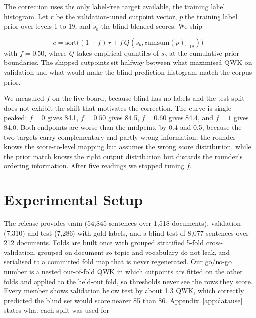 \documentclass[11pt]{article}
\begin{document}
The correction uses the only label-free target available, the training label histogram. Let
$r$ be the validation-tuned cutpoint vector, $p$ the training label prior over levels 1 to
19, and $s_b$ the blind blended scores. We ship

\begin{equation}
c = \mathrm{sort}\big((1-f)\,r + f\,Q(s_b, \mathrm{cumsum}(p)_{1:18})\big)
\end{equation}
with $f = 0.50$, where $Q$ takes empirical quantiles of $s_b$ at the cumulative prior
boundaries. The shipped cutpoints sit halfway between what maximised QWK on validation and
what would make the blind prediction histogram match the corpus prior.

We measured $f$ on the live board, because blind has no labels and the test split does not
exhibit the shift that motivates the correction. The curve is single-peaked: $f=0$ gives
84.1, $f=0.50$ gives 84.5, $f=0.60$ gives 84.4, and $f=1$ gives 84.0. Both endpoints are
worse than the midpoint, by 0.4 and 0.5, because the two targets carry complementary and
partly wrong information: the rounder knows the score-to-level mapping but assumes the wrong
score distribution, while the prior match knows the right output distribution but discards
the rounder's ordering information. After five readings we stopped tuning $f$.

\section{Experimental Setup}
\label{sec:setup}

The release provides train (54,845 sentences over 1,518 documents), validation (7,310) and
test (7,286) with gold labels, and a blind test of 8,077 sentences over 212 documents. Folds
are built once with grouped stratified 5-fold cross-validation, grouped on document so topic
and vocabulary do not leak, and serialised to a committed fold map that is never
regenerated. Our go/no-go number is a nested out-of-fold QWK in which cutpoints are fitted
on the other folds and applied to the held-out fold, so thresholds never see the rows they
score. Every member shows validation below test by about 1.3 QWK, which correctly predicted
the blind set would score nearer 85 than 86. Appendix~\ref{app:datause} states what each
split was used for.
\end{document}
